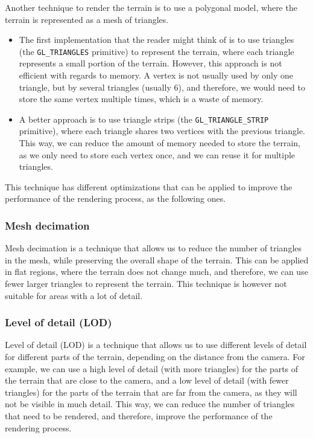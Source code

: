 Another technique to render the terrain is to use a polygonal model, where the terrain is represented as a mesh of triangles.
\begin{itemize}
    \item The first implementation that the reader might think of is to use triangles (the \texttt{GL\_TRIANGLES} primitive) to represent the terrain, where each triangle represents a small portion of the terrain. However, this approach is not efficient with regards to memory. A vertex is not usually used by only one triangle, but by several triangles (usually 6), and therefore, we would need to store the same vertex multiple times, which is a waste of memory.
    \item A better approach is to use triangle strips (the \texttt{GL\_TRIANGLE\_STRIP} primitive), where each triangle shares two vertices with the previous triangle. This way, we can reduce the amount of memory needed to store the terrain, as we only need to store each vertex once, and we can reuse it for multiple triangles.
\end{itemize}

This technique has different optimizations that can be applied to improve the performance of the rendering process, as the following ones.

\subsubsection{Mesh decimation}

Mesh decimation is a technique that allows us to reduce the number of triangles in the mesh, while preserving the overall shape of the terrain. This can be applied in flat regions, where the terrain does not change much, and therefore, we can use fewer larger triangles to represent the terrain. This technique is however not suitable for areas with a lot of detail.

\subsubsection{Level of detail (LOD)}

Level of detail (LOD) is a technique that allows us to use different levels of detail for different parts of the terrain, depending on the distance from the camera. For example, we can use a high level of detail (with more triangles) for the parts of the terrain that are close to the camera, and a low level of detail (with fewer triangles) for the parts of the terrain that are far from the camera, as they will not be visible in much detail. This way, we can reduce the number of triangles that need to be rendered, and therefore, improve the performance of the rendering process.

